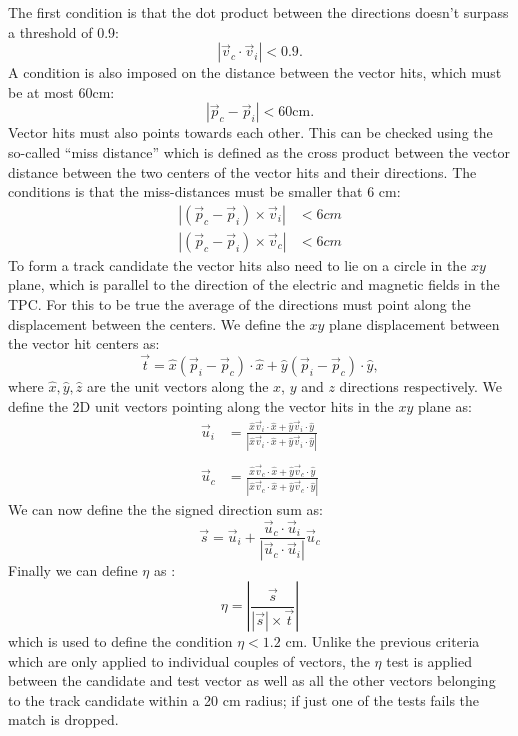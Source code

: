 The first condition is that the dot product between the directions doesn't surpass a threshold of 0.9:
\begin{equation}
    |\Vec{v}_c\cdot\Vec{v}_i|<0.9.
\end{equation}
A condition is also imposed on the distance between the vector hits, which must be at most 60cm:
\begin{equation}
    |\Vec{p}_c-\Vec{p}_i|<60 \text{cm}.
\end{equation}
Vector hits must also points towards each other. This can be checked using the so-called \enquote{miss distance} which is defined as the cross product between the vector distance between the two centers of the vector hits and their directions. The conditions is that the miss-distances must be smaller that 6 cm:
\begin{equation}
    \begin{aligned}
    |(\Vec{p}_c-\Vec{p}_i)\times\Vec{v}_i|&<6cm \\
    |(\Vec{p}_c-\Vec{p}_i)\times\Vec{v}_c|&<6cm 
    \end{aligned}   
\end{equation} 
To form a track candidate the vector hits also need to lie on a circle in the $xy$ plane, which is parallel to the direction of the electric and magnetic fields in the TPC. For this to be true the average of the directions must point along
the displacement between the centers. We define the $xy$ plane displacement between the vector hit centers as:
\begin{equation}
    \Vec{t}=\hat{x}(\Vec{p}_i-\Vec{p}_c)\cdot\hat{x}+\hat{y}(\Vec{p}_i-\Vec{p}_c)\cdot\hat{y},
\end{equation}
where $\hat{x},\hat{y},\hat{z}$ are the unit vectors along the $x$, $y$ and $z$ directions respectively. We define the 2D unit vectors pointing along the vector hits in the $xy$ plane as:
\begin{equation}
    \begin{aligned}
    \Vec{u}_i&=\frac{\hat{x}\Vec{v}_i\cdot\hat{x}+\hat{y}\Vec{v}_i\cdot\hat{y}}{|\hat{x}\Vec{v}_i\cdot\hat{x}+\hat{y}\Vec{v}_i\cdot\hat{y}|} \\ \\
    \Vec{u}_c&=\frac{\hat{x}\Vec{v}_c\cdot\hat{x}+\hat{y}\Vec{v}_c\cdot\hat{y}}{|\hat{x}\Vec{v}_c\cdot\hat{x}+\hat{y}\Vec{v}_c\cdot\hat{y}|}  
    \end{aligned}   
\end{equation} 
We can now define the the signed direction sum as:
\begin{equation}
    \Vec{s}=\Vec{u}_i+\frac{\Vec{u}_c\cdot\Vec{u}_i}{|\Vec{u}_c\cdot\Vec{u}_i|}\Vec{u}_c
\end{equation}
Finally we can define $\eta$ as :
\begin{equation}
    \eta = \left|\frac{\Vec{s}}{|\Vec{s}|\times\Vec{t}}\right|
\end{equation}
which is used to define the condition $\eta<1.2$ cm. Unlike the previous criteria which are only applied to individual couples of vectors, the $\eta$ test is applied between the candidate and test vector as well as all the other vectors belonging to the track candidate within a 20 cm radius; if just one of the tests fails the match is dropped.

